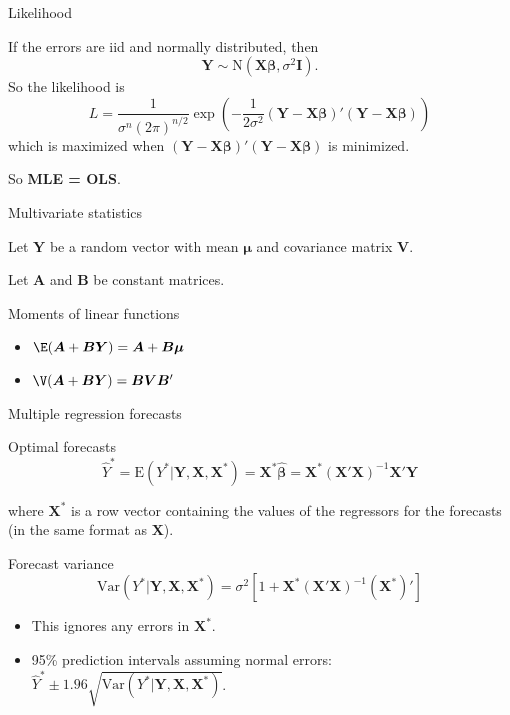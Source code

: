 \documentclass[14pt]{beamer}
\makeatletter
\def\biz{\begin{itemize}[<+-| alert@+>]}
\def\eiz{\end{itemize}}
\makeatother
\begin{document}
\begin{frame}{Likelihood}

If the errors are iid and normally distributed, then
\[
\bm{Y} \sim \text{N}(\bm{X}\bm{\beta},\sigma^2\bm{I}).
\]\pause
So the likelihood is
\[
L = \frac{1}{\sigma^n(2\pi)^{n/2}}\exp\left(-\frac1{2\sigma^2}(\bm{Y}-\bm{X}\bm{\beta})'(\bm{Y}-\bm{X}\bm{\beta})\right)
\]\pause
which is maximized when $(\bm{Y}-\bm{X}\bm{\beta})'(\bm{Y}-\bm{X}\bm{\beta})$ is minimized.\pause

\centerline{\textcolor[rgb]{0.80,0.00,0.00}{So \textbf{MLE = OLS}.}}
\end{frame}


\begin{frame}{Multivariate statistics}

Let $\bm{Y}$ be a random vector with mean $\bm{\mu}$ and covariance matrix $\bm{V}$.

Let $\bm{A}$ and $\bm{B}$ be constant matrices.

\pause

\begin{block}{Moments of linear functions}
\biz
\item $\E(\bm{A}+\bm{B}\bm{Y}) = \bm{A}+\bm{B}\bm{\mu}$
\item $\V(\bm{A}+\bm{B}\bm{Y}) = \bm{B}\bm{V}\bm{B}'$
\eiz
\end{block}

\end{frame}

\begin{frame}{Multiple regression forecasts}

\begin{block}{Optimal forecasts}\vspace*{-0.7cm}
\[
\hat{Y}^* =
\text{E}(Y^* | \bm{Y},\bm{X},\bm{X}^*) =
\bm{X}^*\hat{\bm{\beta}} = \bm{X}^*(\bm{X}'\bm{X})^{-1}\bm{X}'\bm{Y}
\]
\end{block}
where $\bm{X}^*$ is a row vector containing the values of the regressors for the forecasts (in the same format as $\bm{X}$).\vspace*{0.cm}

\pause

\begin{block}{Forecast variance}\vspace*{-0.7cm}
\[
\text{Var}(Y^* | \bm{Y},\bm{X},\bm{X}^*) = \sigma^2 \left[1 + \bm{X}^* (\bm{X}'\bm{X})^{-1} (\bm{X}^*)'\right]
\]
\end{block}\pause

\biz
\item This ignores any errors in $\bm{X}^*$.

\item 95\% prediction intervals assuming normal errors:
$  \hat{Y}^* \pm 1.96 \sqrt{\text{Var}(Y^*| \bm{Y},\bm{X},\bm{X}^*)}
$.
\eiz

\end{frame}
\end{document}
